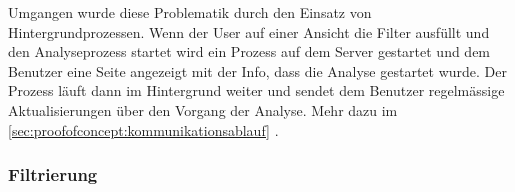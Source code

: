 Umgangen wurde diese Problematik durch den Einsatz von Hintergrundprozessen. Wenn der User auf einer Ansicht die Filter ausfüllt und den Analyseprozess startet wird ein Prozess auf dem Server gestartet und dem Benutzer eine Seite angezeigt mit der Info, dass die Analyse gestartet wurde. Der Prozess läuft dann im Hintergrund weiter und sendet dem Benutzer regelmässige Aktualisierungen über den Vorgang der Analyse. Mehr dazu im \cref{sec:proofofconcept:kommunikationsablauf} .

\subsubsection{Filtrierung}
\label{sec:proofofconcept:architektur:anforderungen:filtrierung}


%
%


